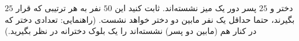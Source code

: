 \EXERCISE
$25$
دختر و
$25$
پسر دور یک میز نشسته‌اند. ثابت کنید این
$50$
نفر به هر ترتیبی که قرار بگیرند، حتما حداقل یک نفر مابین دو دختر خواهد نشست. (راهنمایی: تعدادی دختر که در کنار هم (مابین دو پسر) نشسته‌اند را یک بلوک دخترانه در نظر بگیرید.)